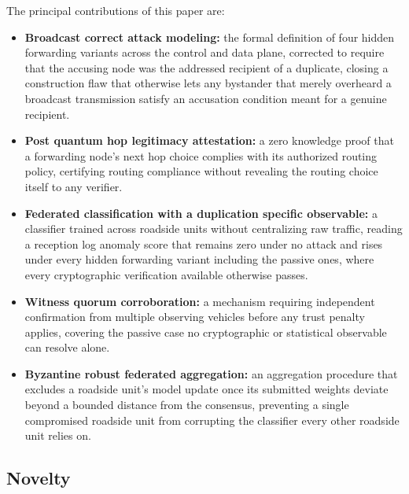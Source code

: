 \documentclass[final,5p,twocolumn]{elsarticle}
\theoremstyle{remark}
\theoremstyle{plain}
\begin{document}
The principal contributions of this paper are:
\begin{itemize}
	\item \textbf{Broadcast correct attack modeling:} the formal
	definition of four hidden forwarding variants across the control and
	data plane, corrected to require that the accusing node was the
	addressed recipient of a duplicate, closing a construction flaw that
	otherwise lets any bystander that merely overheard a broadcast
	transmission satisfy an accusation condition meant for a genuine
	recipient.
	\item \textbf{Post quantum hop legitimacy attestation:} a zero
	knowledge proof that a forwarding node's next hop choice complies with
	its authorized routing policy, certifying routing compliance without
	revealing the routing choice itself to any verifier.
	\item \textbf{Federated classification with a duplication specific
	observable:} a classifier trained across roadside units without
	centralizing raw traffic, reading a reception log anomaly score that
	remains zero under no attack and rises under every hidden forwarding
	variant including the passive ones, where every cryptographic
	verification available otherwise passes.
	\item \textbf{Witness quorum corroboration:} a mechanism requiring
	independent confirmation from multiple observing vehicles before any
	trust penalty applies, covering the passive case no cryptographic or
	statistical observable can resolve alone.
	\item \textbf{Byzantine robust federated aggregation:} an aggregation
	procedure that excludes a roadside unit's model update once its
	submitted weights deviate beyond a bounded distance from the
	consensus, preventing a single compromised roadside unit from
	corrupting the classifier every other roadside unit relies on.
\end{itemize}

\subsection{Novelty}
\end{document}
